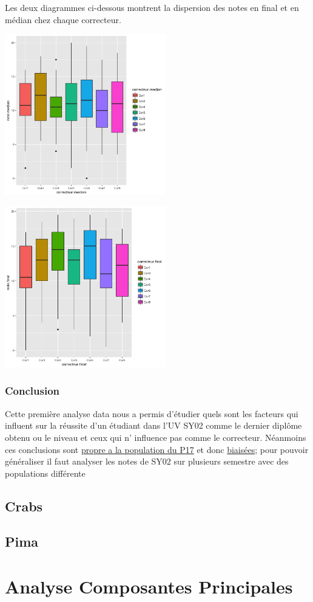 \documentclass[]{report}
\begin{document}
\begin{minipage}{\linewidth}
	Les deux diagrammes ci-dessous montrent la dispersion des notes en final et en médian chez chaque correcteur.\\
	\begin{minipage}{0.50\linewidth}
	\includegraphics[width=70mm]{Figures/Notes/correcteur_median.png}
	\label{fig:scatter_correcteur_median}
	\end{minipage}
	\hspace{0.08\linewidth}
	\begin{minipage}{0.40\linewidth}	
		\includegraphics[width=70mm]{Figures/Notes/correcteur_final.png}
		\label{fig:scatter_correcteur_median}
	\end{minipage}
\end{minipage}

\subsubsection{Conclusion}
Cette première analyse data nous a permis d'étudier  quels sont les facteurs qui influent sur la réussite d'un étudiant dans l'UV SY02 comme le dernier diplôme obtenu ou le niveau et ceux qui n' influence pas comme le correcteur. Néanmoins ces conclusions sont \underline{propre a la population du P17} et donc  \underline{biaisées}; pour pouvoir généraliser il faut analyser les notes de SY02 sur plusieurs semestre avec des populations différente 

\subsection{Crabs}

\subsection{Pima}

\section{Analyse Composantes Principales}
\end{document}
